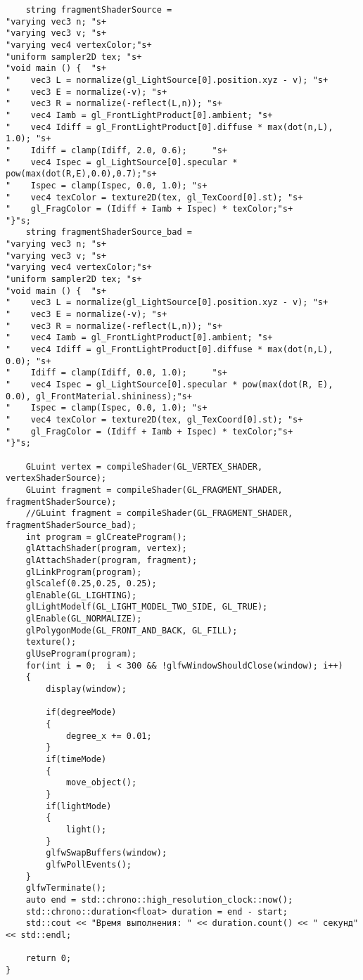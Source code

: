 \documentclass[a4paper, 14pt]{extarticle}
\begin{document}
\begin{verbatim}
    string fragmentShaderSource =
"varying vec3 n; "s+
"varying vec3 v; "s+
"varying vec4 vertexColor;"s+
"uniform sampler2D tex; "s+
"void main () {  "s+
"    vec3 L = normalize(gl_LightSource[0].position.xyz - v); "s+
"    vec3 E = normalize(-v); "s+
"    vec3 R = normalize(-reflect(L,n)); "s+
"    vec4 Iamb = gl_FrontLightProduct[0].ambient; "s+
"    vec4 Idiff = gl_FrontLightProduct[0].diffuse * max(dot(n,L), 1.0); "s+
"    Idiff = clamp(Idiff, 2.0, 0.6);     "s+
"    vec4 Ispec = gl_LightSource[0].specular * pow(max(dot(R,E),0.0),0.7);"s+
"    Ispec = clamp(Ispec, 0.0, 1.0); "s+
"    vec4 texColor = texture2D(tex, gl_TexCoord[0].st); "s+
"    gl_FragColor = (Idiff + Iamb + Ispec) * texColor;"s+
"}"s;
    string fragmentShaderSource_bad =
"varying vec3 n; "s+
"varying vec3 v; "s+
"varying vec4 vertexColor;"s+
"uniform sampler2D tex; "s+
"void main () {  "s+
"    vec3 L = normalize(gl_LightSource[0].position.xyz - v); "s+
"    vec3 E = normalize(-v); "s+
"    vec3 R = normalize(-reflect(L,n)); "s+
"    vec4 Iamb = gl_FrontLightProduct[0].ambient; "s+
"    vec4 Idiff = gl_FrontLightProduct[0].diffuse * max(dot(n,L), 0.0); "s+
"    Idiff = clamp(Idiff, 0.0, 1.0);     "s+
"    vec4 Ispec = gl_LightSource[0].specular * pow(max(dot(R, E), 0.0), gl_FrontMaterial.shininess);"s+
"    Ispec = clamp(Ispec, 0.0, 1.0); "s+
"    vec4 texColor = texture2D(tex, gl_TexCoord[0].st); "s+
"    gl_FragColor = (Idiff + Iamb + Ispec) * texColor;"s+
"}"s;

    GLuint vertex = compileShader(GL_VERTEX_SHADER, vertexShaderSource);
    GLuint fragment = compileShader(GL_FRAGMENT_SHADER, fragmentShaderSource);
    //GLuint fragment = compileShader(GL_FRAGMENT_SHADER, fragmentShaderSource_bad); 
    int program = glCreateProgram();
    glAttachShader(program, vertex);
    glAttachShader(program, fragment);
    glLinkProgram(program);
    glScalef(0.25,0.25, 0.25);
    glEnable(GL_LIGHTING);
    glLightModelf(GL_LIGHT_MODEL_TWO_SIDE, GL_TRUE);
    glEnable(GL_NORMALIZE);
    glPolygonMode(GL_FRONT_AND_BACK, GL_FILL);
    texture();
    glUseProgram(program);
    for(int i = 0;  i < 300 && !glfwWindowShouldClose(window); i++)
    {
        display(window);

        if(degreeMode)
        {
            degree_x += 0.01;
        }
        if(timeMode)
        {
            move_object();
        }
        if(lightMode)
        {
            light();
        }
        glfwSwapBuffers(window);
        glfwPollEvents();
    }
    glfwTerminate();
    auto end = std::chrono::high_resolution_clock::now();
    std::chrono::duration<float> duration = end - start;
    std::cout << "Время выполнения: " << duration.count() << " секунд" << std::endl;

    return 0;
}
\end{verbatim}
\end{document}
